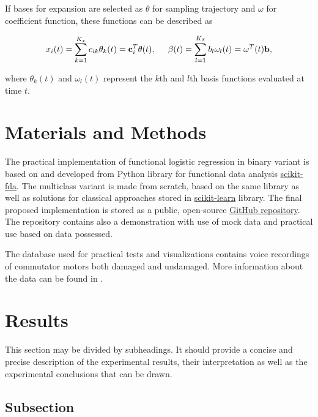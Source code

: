 \documentclass[energies,article,submit,pdftex,moreauthors]{Definitions/mdpi}
\begin{document}
If bases for expansion are selected as $\theta$ for sampling trajectory and $\omega$ for coefficient function, these functions can be described as
\begin{linenomath}
\begin{equation}
x_i(t) = \sum_{k=1}^{K_x} c_{ik} \theta_k (t) = {\bf c}_i^T \theta (t),
\hspace{5mm} \beta(t) = \sum_{l=1}^{K_{\beta}} b_l \omega_l (t) = \omega^T (t) {\bf b},
\end{equation}
\end{linenomath}
where $\theta_k (t)$ and $\omega_l (t)$ represent the $k$th and $l$th basis functions evaluated at time $t$.


\section{Materials and Methods}

The practical implementation of functional logistic regression in binary variant is based on and developed from Python library for functional data analysis \href{https://fda.readthedocs.io/en/latest/index.html}{scikit-fda}. The multiclass variant is made from scratch, based on the same library as well as solutions for classical approaches stored in \href{https://scikit-learn.org/}{scikit-learn} library. The final proposed implementation is stored as a public, open-source \href{https://github.com/Porbi96/fda-time-series-classification}{GitHub repository}. The repository contains also a demonstration with use of mock data and practical use based on data possessed.

The database used for practical tests and visualizations contains voice recordings of commutator motors both damaged and undamaged. More information about the data can be found in \cite{ref-motors}.

\section{Results}

This section may be divided by subheadings. It should provide a concise and precise description of the experimental results, their interpretation as well as the experimental conclusions that can be drawn.
\subsection{Subsection}
\end{document}
